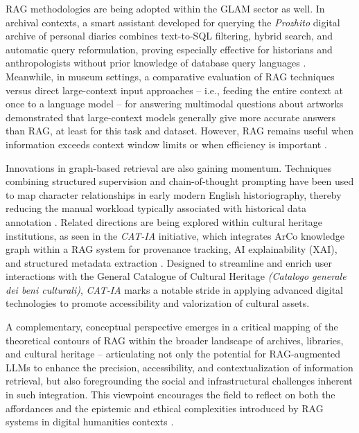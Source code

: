 \begin{spacing}{1.5}
RAG methodologies are being adopted within the GLAM sector as well. In archival contexts, a smart assistant developed for querying the \textit{Prozhito} digital archive of personal diaries combines text-to-SQL filtering, hybrid search, and automatic query reformulation, proving especially effective for historians and anthropologists without prior knowledge of database query languages  \citep{sergeev_talking_2025}. Meanwhile, in museum settings, a comparative evaluation of RAG techniques versus direct large-context input approaches -- i.e., feeding the entire context at once to a language model -- for answering multimodal questions about artworks demonstrated that large-context models generally give more accurate answers than RAG, at least for this task and dataset. However, RAG remains useful when information exceeds context window limits or when efficiency is important \citep{ramos-varela_context_2025}.

Innovations in graph-based retrieval are also gaining momentum. Techniques combining structured supervision and chain-of-thought prompting have been used to map character relationships in early modern English historiography, thereby reducing the manual workload typically associated with historical data annotation \citep{fan_research_2025}. Related directions are being explored within cultural heritage institutions, as seen in the \textit{CAT-IA} initiative, which integrates ArCo knowledge graph \citep{carriero_arco_2019} within a RAG system for provenance tracking, AI explainability (XAI), and structured metadata extraction \citep{barbato_nasce_2025}. Designed to streamline and enrich user interactions with the General Catalogue of Cultural Heritage \textit{(Catalogo generale dei beni culturali)}, \textit{CAT-IA} marks a notable stride in applying advanced digital technologies to promote accessibility and valorization of cultural assets.

A complementary, conceptual perspective emerges in a critical mapping of the theoretical contours of RAG within the broader landscape of archives, libraries, and cultural heritage -- articulating not only the potential for RAG-augmented LLMs to enhance the precision, accessibility, and contextualization of information retrieval, but also foregrounding the social and infrastructural challenges inherent in such integration. This viewpoint encourages the field to reflect on both the affordances and the epistemic and ethical complexities introduced by RAG systems in digital humanities contexts \citep{di_marcantonio_intelligenza_2024}.



\end{spacing}
